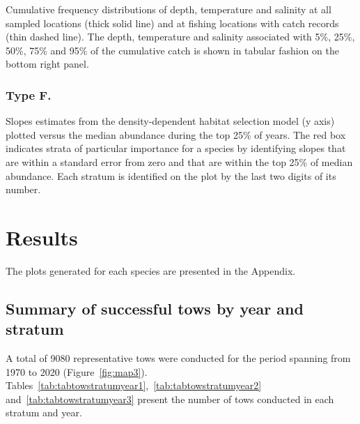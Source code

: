 \documentclass[12pt]{article}\usepackage[]{graphicx}\usepackage[]{color}
\begin{document}
Cumulative frequency distributions of depth, temperature and salinity at all sampled locations (thick solid line) and at fishing locations with catch records (thin dashed line). The depth, temperature and salinity associated with 5\%, 25\%, 50\%, 75\% and 95\% of the cumulative catch is shown in tabular fashion on the bottom right panel.

\hypertarget{type-f.}{%
\subsubsection{Type F.}\label{type-f.}}

Slopes estimates from the density-dependent habitat selection model (y axis) plotted versus the median abundance during the top 25\% of years. The red box indicates strata of particular importance for a species by identifying slopes that are within a standard error from zero and that are within the top 25\% of median abundance. Each stratum is identified on the plot by the last two digits of its number.

\hypertarget{results}{%
\section{Results}\label{results}}

The plots generated for each species are presented in the Appendix.

\hypertarget{summary-of-successful-tows-by-year-and-stratum}{%
\subsection{Summary of successful tows by year and stratum}\label{summary-of-successful-tows-by-year-and-stratum}}

A total of 9080 representative tows were conducted for the period spanning from 1970 to 2020 (Figure~\ref{fig:map3}). Tables~\ref{tab:tabtowstratumyear1},~\ref{tab:tabtowstratumyear2} and~\ref{tab:tabtowstratumyear3} present the number of tows conducted in each stratum and year.
\end{document}
